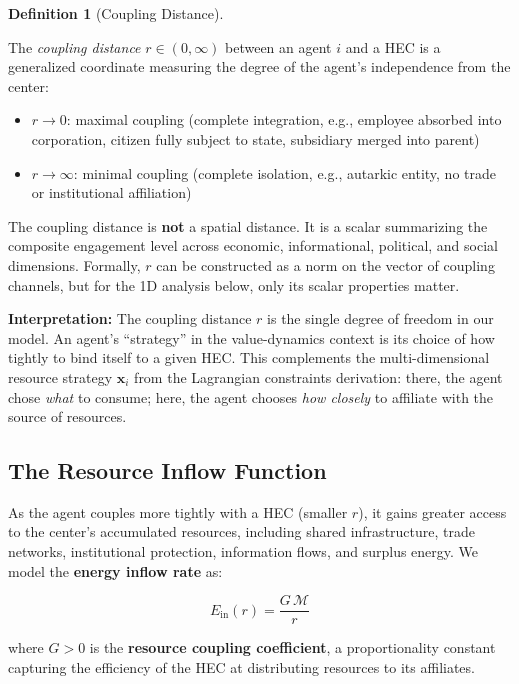 \documentclass[11pt]{article}
\theoremstyle{plain}
\theoremstyle{definition}
\newtheorem{definition}{Definition}
\theoremstyle{remark}
\let\origsubsection\subsection
\renewcommand{\subsection}{\needspace{7\baselineskip}\origsubsection}
\begin{document}
\begin{definition}[Coupling Distance]
\label{def-coupling-distance}

The \emph{coupling distance} $r \in (0, \infty)$ between an agent $i$ and a HEC is a generalized coordinate measuring the degree of the agent's independence from the center:

\begin{itemize}
\item $r \to 0$: maximal coupling (complete integration, e.g., employee absorbed into corporation, citizen fully subject to state, subsidiary merged into parent)
\item $r \to \infty$: minimal coupling (complete isolation, e.g., autarkic entity, no trade or institutional affiliation)
\end{itemize}
The coupling distance is \textbf{not} a spatial distance. It is a scalar summarizing the composite engagement level across economic, informational, political, and social dimensions. Formally, $r$ can be constructed as a norm on the vector of coupling channels, but for the 1D analysis below, only its scalar properties matter.
\end{definition}

\textbf{Interpretation:} The coupling distance \(r\) is the single
degree of freedom in our model. An agent's ``strategy'' in the
value-dynamics context is its choice of how tightly to bind itself to a
given HEC. This complements the multi-dimensional resource strategy
\(\mathbf{x}_i\) from the Lagrangian constraints derivation: there, the
agent chose \emph{what} to consume; here, the agent chooses \emph{how
closely} to affiliate with the source of resources.

\subsection{The Resource Inflow
Function}\label{the-resource-inflow-function}

As the agent couples more tightly with a HEC (smaller \(r\)), it gains
greater access to the center's accumulated resources, including shared
infrastructure, trade networks, institutional protection, information
flows, and surplus energy. We model the \textbf{energy inflow rate} as:

\[E_{\text{in}}(r) = \frac{G \, \mathcal{M}}{r}\]

where \(G > 0\) is the \textbf{resource coupling coefficient}, a
proportionality constant capturing the efficiency of the HEC at
distributing resources to its affiliates.
\end{document}
